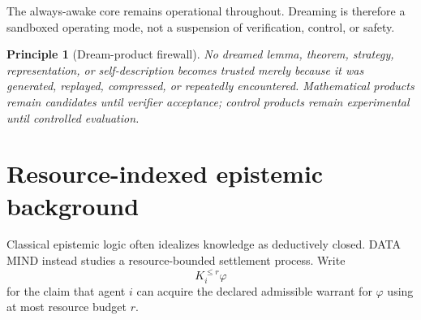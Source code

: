 \documentclass[11pt]{article}
\newtheorem{principle}[definition]{Principle}
\begin{document}
The always-awake core remains operational throughout. Dreaming is therefore a sandboxed operating mode, not a suspension of verification, control, or safety.

\begin{principle}[Dream-product firewall]
No dreamed lemma, theorem, strategy, representation, or self-description becomes trusted merely because it was generated, replayed, compressed, or repeatedly encountered. Mathematical products remain candidates until verifier acceptance; control products remain experimental until controlled evaluation.
\end{principle}

\section{Resource-indexed epistemic background}

Classical epistemic logic often idealizes knowledge as deductively closed. DATA MIND instead studies a resource-bounded settlement process. Write
\begin{equation}
K_i^{\le r}\varphi
\end{equation}
for the claim that agent $i$ can acquire the declared admissible warrant for $\varphi$ using at most resource budget $r$.
\end{document}
